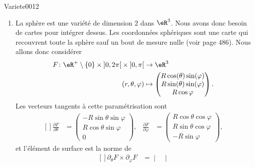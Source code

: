 
\begin{corrige}{Variete0012}

	\begin{enumerate}

		\item
			La sphère est une variété de dimension $2$ dans $\eR^3$. Nous avons donc besoin de cartes pour intégrer dessus. Les coordonnées sphériques sont une carte qui recouvrent toute la sphère sauf un bout de mesure nulle (voir page $486$). Nous allons donc considérer
			\begin{equation}
				\begin{aligned}
					F\colon \eR^+\setminus\{ 0 \}\times\mathopen] 0 , 2\pi \mathclose[\times\mathopen] 0 , \pi \mathclose[&\to \eR^3 \\
					(r,\theta,\varphi)&\mapsto \begin{pmatrix}
						R\cos(\theta)\sin(\varphi)	\\ 
						R\sin(\theta)\sin(\varphi)	\\ 
						R\cos\varphi	
					\end{pmatrix}.
				\end{aligned}
			\end{equation}
			Les vecteurs tangents à cette paramétrisation sont
			\begin{equation}
				\begin{aligned}[]
					\frac{ \partial F }{ \partial \theta }&=\begin{pmatrix}
						-R\sin\theta\sin\varphi	\\ 
						R\cos\theta\sin\varphi	\\ 
						0	
					\end{pmatrix},
					&\frac{ \partial F }{ \partial \varphi }&=\begin{pmatrix}
						R\cos\theta\cos\varphi	\\ 
						R\sin\theta\cos\varphi	\\ 
						-R\sin\varphi	
					\end{pmatrix},
				\end{aligned}
			\end{equation}
			et l'élément de surface est la norme de 
			\begin{equation}
				\begin{aligned}[]
					\partial_\theta F\times\partial_{\varphi}F
					&=\begin{vmatrix}

\end{vmatrix}
\end{aligned}
\end{equation}
\end{enumerate}
\end{corrige}
